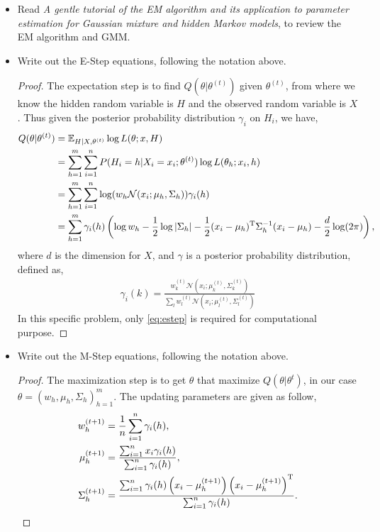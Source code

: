 \documentclass[12pt]{article}
\newcommand{\E}{\mathbb{E}}
\newcommand{\1}{\mathbf{1}}
\begin{document}
{\begin{itemize}
  \item Read {\em A gentle tutorial of the EM algorithm and its application to parameter estimation for Gaussian mixture and hidden Markov models}, to review the EM algorithm and GMM.
  \item Write out the E-Step equations, following the notation above.
  \begin{proof}
    The expectation step is to find $Q(\theta | \theta^{(t)})$ given $\theta^{(t)}$, from where we know the hidden random variable is $H$ and the observed random variable is $X$. Thus given the posterior probability distribution $\gamma_i$ on $H_i$, we have,
    \begin{align*}
      Q(\theta | \theta^{(t)}) &= \E_{H|X, \theta^{(t)}} \log L(\theta; x, H) \\
      &= \sum_{h=1}^m \sum_{i=1}^n P(H_i = h | X_i = x_i;\theta^{(t)}) \log L(\theta_h; x_i, h) \\
      &= \sum_{h=1}^m \sum_{i=1}^n \log (w_h \mathcal{N}(x_i; \mu_h, \Sigma_h)) \gamma_i(h) \\
      &= \sum_{h=1}^m \gamma_i(h) \left(\log w_h - \frac{1}{2}\log |\Sigma_h| - \frac{1}{2}(x_i - \mu_h)^{\rm T} \Sigma_h^{-1} (x_i - \mu_h) - \frac{d}{2} \log (2\pi) \right),
    \end{align*}
    where $d$ is the dimension for $X$, and $\gamma$ is a posterior probability distribution, defined as,
    \begin{align}
      \gamma_i(k) = \frac{w_k^{(t)} \mathcal{N}(x_i; \mu_k^{(t)}, \Sigma_k^{(t)})}{\sum_l w_l^{(t)} \mathcal{N}(x_i; \mu_l^{(t)}, \Sigma_l^{(t)})} \label{eq:estep}
    \end{align}
    In this specific problem, only \eqref{eq:estep} is required for computational purpose.
  \end{proof}
  \item Write out the M-Step equations, following the notation above.
  \begin{proof}
    The maximization step is to get $\theta$ that maximize $Q(\theta|\theta^{t})$, in our case $\theta = \left(w_h, \mu_h, \Sigma_h\right)_{h=1}^m$. The updating parameters are given as follow,
    \begin{align}
      w_h^{(t+1)} &= \frac{1}{n} \sum_{i=1}^n \gamma_i(h) , \label{eq:weight}\\
      \mu_h^{(t+1)}&= \frac{\sum_{i=1}^n x_i \gamma_i(h)}{\sum_{i=1}^n \gamma_i(h)} , \label{eq:mean}\\
      \Sigma_h^{(t+1)} &= \frac{\sum_{i=1}^n \gamma_i(h) \left(x_i - \mu_h^{(t+1)}\right)\left(x_i - \mu_h^{(t+1)}\right)^{\rm T}}{\sum_{i=1}^n \gamma_i(h)}. \label{eq:variance}
    \end{align}
  \end{proof}
\end{itemize}

}
\end{document}
